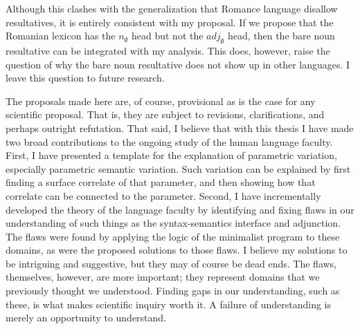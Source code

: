 \documentclass[MilwayThesis]{subfiles}
\begin{document}
Although this clashes with the generalization that Romance language disallow resultatives, it is entirely consistent with my proposal.
If we propose that the Romanian lexicon has the $n_{\emptyset}$ head but not the $adj_{\emptyset}$ head, then the bare noun resultative can be integrated with my analysis.
This does, however, raise the question of why the bare noun resultative does not show up in other languages.
I leave this question to future research.


The proposals made here are, of course, provisional as is the case for any scientific proposal.
That is, they are subject to revisions, clarifications, and perhaps outright refutation.
That said, I believe that with this thesis I have made two broad contributions to the ongoing study of the human language faculty.
First, I have presented a template for the explanation of parametric variation, especially parametric semantic variation.
Such variation can be explained by first finding a surface correlate of that parameter, and then showing how that correlate can be connected to the parameter.
Second, I have incrementally developed the theory of the language faculty by identifying and fixing flaws in our understanding of such things as the syntax-semantics interface and adjunction.
The flaws were found by applying the logic of the minimalist program to these domains, as were the proposed solutions to those flaws.
I believe my solutions to be intriguing and suggestive, but they may of course be dead ends.
The flaws, themselves, however, are more important; they represent domains that we previously thought we understood.
Finding gaps in our understanding, such as these, is what makes scientific inquiry worth it.
A failure of understanding is merely an opportunity to understand.
\end{document}
